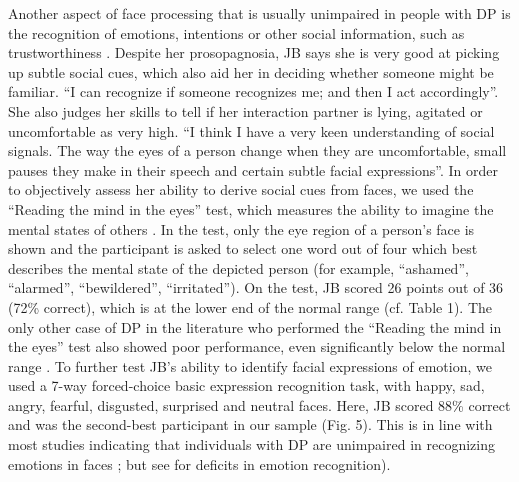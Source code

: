 \documentclass[fleqn,10pt]{SelfArx} %
\begin{document}
Another aspect of face processing that is usually unimpaired in people with DP is the recognition of emotions, intentions or other social information, such as trustworthiness \citep{Todorov_2008, Duchaine_2009}. Despite her prosopagnosia, JB says she is very good at picking up subtle social cues, which also aid her in deciding whether someone might be familiar. “I can recognize if someone recognizes me; and then I act accordingly”. She also judges her skills to tell if her interaction partner is lying, agitated or uncomfortable as very high. “I think I have a very keen understanding of social signals. The way the eyes of a person change when they are uncomfortable, small pauses they make in their speech and certain subtle facial expressions”. In order to objectively assess her ability to derive social cues from faces, we used the “Reading the mind in the eyes” test, which measures the ability to imagine the mental states of others \citep{Baron_Cohen_2001}. In the test, only the eye region of a person's face is shown and the participant is asked to select one word out of four which best describes the mental state of the depicted person (for example, “ashamed”, “alarmed”, “bewildered”, “irritated”). On the test, JB scored 26 points out of 36 (72\% correct), which is at the lower end of the normal range (cf. Table 1). The only other case of DP in the literature who performed the “Reading the mind in the eyes” test also showed poor performance, even significantly below the normal range \citep{Duchaine_2006cog}.
To further test JB's ability to identify facial expressions of emotion, we used a 7-way forced-choice basic expression recognition task, with happy, sad, angry, fearful, disgusted, surprised and neutral faces. Here, JB scored 88\% correct and was the second-best participant in our sample (Fig. 5). This is in line with most studies indicating that individuals with DP are unimpaired in recognizing emotions in faces \citep{Duchaine_2003, Humphreys_2006}; but see \citep{Duchaine_2006cog} for deficits in emotion recognition).
\end{document}
